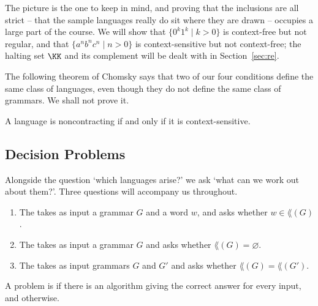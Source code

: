 \begin{center}
\end{center}

The picture is the one to keep in mind, and proving that the inclusions are all strict -- that the sample languages really do sit where they are drawn -- occupies a large part of the course. We will show that $\{0^k1^k \mid k > 0\}$ is context-free but not regular, and that $\{a^nb^nc^n \mid n > 0\}$ is context-sensitive but not context-free; the halting set $\KK$ and its complement will be dealt with in Section~\ref{sec:re}.

The following theorem of Chomsky says that two of our four conditions define the same class of languages, even though they do not define the same class of grammars. We shall not prove it.

\begin{theorem}[Chomsky]
	A language is noncontracting if and only if it is context-sensitive.
\end{theorem}

\subsection{Decision Problems}

Alongside the question `which languages arise?' we ask `what can we work out about them?'. Three questions will accompany us throughout.

\begin{definition}
	\begin{enumerate}[label=(\roman*)]
		\item The  takes as input a grammar $G$ and a word $w$, and asks whether $w \in \lang(G)$.
		\item The  takes as input a grammar $G$ and asks whether $\lang(G) = \varnothing$.
		\item The  takes as input grammars $G$ and $G'$ and asks whether $\lang(G) = \lang(G')$.
	\end{enumerate}
	A problem is  if there is an algorithm giving the correct answer for every input, and  otherwise.
\end{definition}

